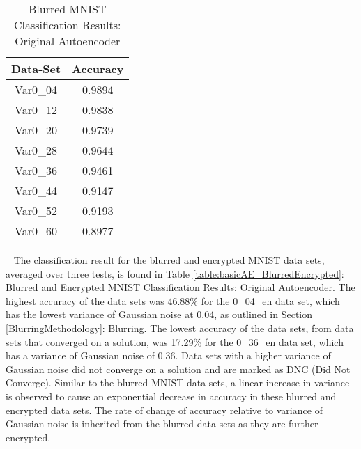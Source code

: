 \documentclass[12pt, titlepage]{article}
\begin{document}
\begin{table}[!h]
	\begin{center}
		\begin{tabular}{| c | c |}
			\hline
			\textbf{Data-Set} & \textbf{Accuracy}\\
			\hline
			Var0\_04 & 0.9894\\
			\hline
			Var0\_12 & 0.9838\\
			\hline
			Var0\_20 & 0.9739\\
			\hline
			Var0\_28 & 0.9644\\
			\hline
			Var0\_36 & 0.9461\\
			\hline
			Var0\_44 & 0.9147\\
			\hline
			Var0\_52 & 0.9193\\
			\hline
			Var0\_60 & 0.8977\\
			\hline
		\end{tabular}
		\caption{Blurred MNIST Classification Results: Original Autoencoder}
		\label{table:basicAE_Blurred}
	\end{center}
\end{table}

~\newpage
\noindent The classification result for the blurred and encrypted MNIST data sets, averaged over three tests, is found in Table \ref{table:basicAE_BlurredEncrypted}: Blurred and Encrypted MNIST Classification Results: Original Autoencoder. The highest accuracy of the data sets was 46.88\% for the 0\_04\_en data set, which has the lowest variance of Gaussian noise at 0.04, as outlined in Section \ref{BlurringMethodology}: Blurring. The lowest accuracy of the data sets, from data sets that converged on a solution, was 17.29\% for the 0\_36\_en data set, which has a variance of Gaussian noise of 0.36. Data sets with a higher variance of Gaussian noise did not converge on a solution and are marked as DNC (Did Not Converge). Similar to the blurred MNIST data sets, a linear increase in variance is observed to cause an exponential decrease in accuracy in these blurred and encrypted data sets. The rate of change of accuracy relative to variance of Gaussian noise is inherited from the blurred data sets as they are further encrypted.\\ 
\end{document}
